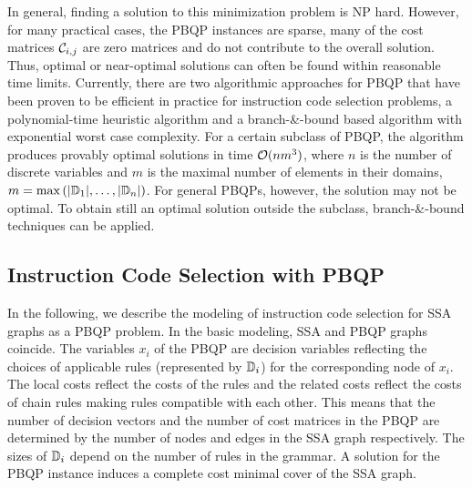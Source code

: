 In general, finding a solution to this minimization problem is NP
hard.  However, for many practical cases, the PBQP instances are
sparse, \ie many of the cost matrices ${\mathcal C}_{i,j}$ are zero
matrices and do not contribute to the overall solution. Thus, optimal
or near-optimal solutions can often be found within reasonable time
limits.  Currently, there are two algorithmic approaches for PBQP that
have been proven to be efficient in practice for instruction code selection
problems, \ie a polynomial-time heuristic algorithm and a
branch-\&-bound based algorithm with exponential worst case
complexity.  For a certain subclass of PBQP, the algorithm produces
provably optimal solutions in time ${\cal O}(n m^3)$, where $n$ is the
number of discrete variables and $m$ is the maximal number of elements
in their domains, \ie $m=\max
\left(|\mathbb D_1|,\ldots,|\mathbb D_n\right|)$. For general
{PBQP}s, however, the solution may not be optimal. To obtain still an
optimal solution outside the subclass, branch-\&-bound techniques can
be applied.

\subsection{Instruction Code Selection with PBQP}
In the following, we describe the modeling of instruction code selection for SSA
graphs as a PBQP problem.  In the basic modeling, SSA and PBQP graphs
coincide.  The variables $x_i$ of the PBQP are decision variables
reflecting the choices of applicable rules (represented by
$\mathbb D_i$) for the corresponding node of $x_i$. The local costs
reflect the costs of the rules and the related costs reflect the costs
of chain rules making rules compatible with each other.  This means
that the number of decision vectors and the number of cost matrices in
the PBQP are determined by the number of nodes and edges in the SSA
graph respectively.  The sizes of $\mathbb D_i$ depend on the number
of rules in the grammar. A solution for the PBQP instance induces a
complete cost minimal cover of the SSA graph.

